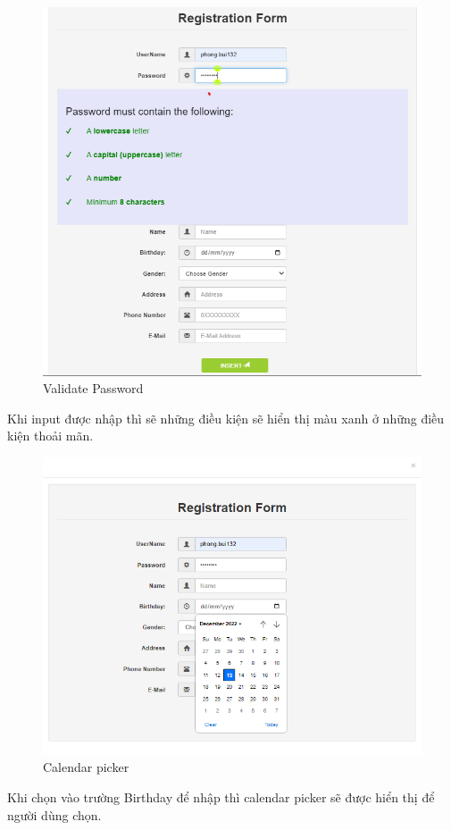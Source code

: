 \begin{figure}[H]
    \centering
    \includegraphics[scale=0.45]{images/insertValidateRightPassword.png}
    \caption{Validate Password}
\end{figure}
Khi input được nhập thì sẽ những điều kiện sẽ hiển thị màu xanh ở những điều kiện thoải mãn.

\begin{figure}[H]
    \centering
    \includegraphics[scale=0.45]{images/calendarPicker.png}
    \caption{Calendar picker}
\end{figure}
Khi chọn vào trường Birthday để nhập thì calendar picker sẽ được hiển thị để người dùng chọn.

